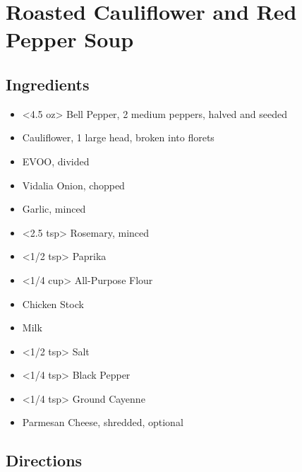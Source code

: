 \section{Roasted Cauliflower and Red Pepper Soup}

\subsection{ Ingredients }

\begin{itemize}
  \item <4.5 oz> Bell Pepper, 2 medium peppers, halved and seeded
  \item <19 oz> Cauliflower, 1 large head, broken into florets
  \item <4 tbs> EVOO, divided
  \item <1 cup> Vidalia Onion, chopped
  \item <2 cloves> Garlic, minced
  \item <2.5 tsp> Rosemary, minced
  \item <1/2 tsp> Paprika
  \item <1/4 cup> All-Purpose Flour
  \item <4 cups> Chicken Stock
  \item <1 cup> Milk
  \item <1/2 tsp> Salt
  \item <1/4 tsp> Black Pepper
  \item <1/4 tsp> Ground Cayenne
  \item <5 g> Parmesan Cheese, shredded, optional
\end{itemize}

\subsection{ Directions }

